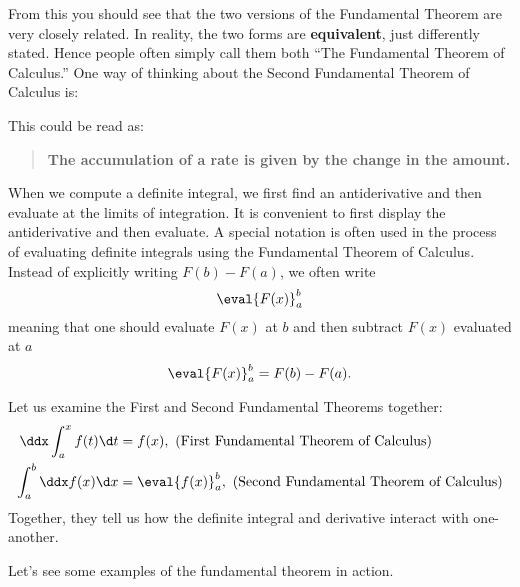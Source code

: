 \documentclass{ximera}
\begin{document}
From this you should see that the two versions of the Fundamental Theorem are very closely related. In reality, the two forms are
\textbf{equivalent}, just differently stated. Hence people often simply call them both ``The Fundamental Theorem of Calculus.''
One way of thinking about the Second Fundamental Theorem of Calculus is:
\begin{image}
\end{image}
This could be read as:
\begin{quote}\large\textbf{The \textcolor{green!70!black!70!blue}{accumulation} of a \textcolor{blue!70!green}{rate} is given by the \textcolor{purple!50!blue!90!black}{change in the amount}.}

\end{quote}


When we compute a definite integral, we first find an antiderivative and then evaluate at the limits of integration. It is convenient to
first display the antiderivative and then evaluate.  A special notation is often used in the process of evaluating definite integrals
using the Fundamental Theorem of Calculus. Instead of explicitly writing $F(b)-F(a)$, we often write
\[ \eval{F(x)}_a^b \]
meaning that one should evaluate $F(x)$ at $b$ and then subtract $F(x)$ evaluated at $a$
\[ \eval{F(x)}_a^b = F(b)-F(a). \]

\begin{remark}
Let us examine the First and Second Fundamental Theorems together:
\begin{align*}
	\ddx \int_a^x f(t) \d t &= f(x), \textrm{ (First Fundamental Theorem of Calculus)}\\
	\int_a^b \ddx f(x) \d x &= \eval{f(x)}_a^b, \textrm{ (Second Fundamental Theorem of Calculus)}
\end{align*}
Together, they tell us how the definite integral and derivative interact with one-another.
\end{remark}

Let's see some examples of the fundamental theorem in action.
\end{document}
